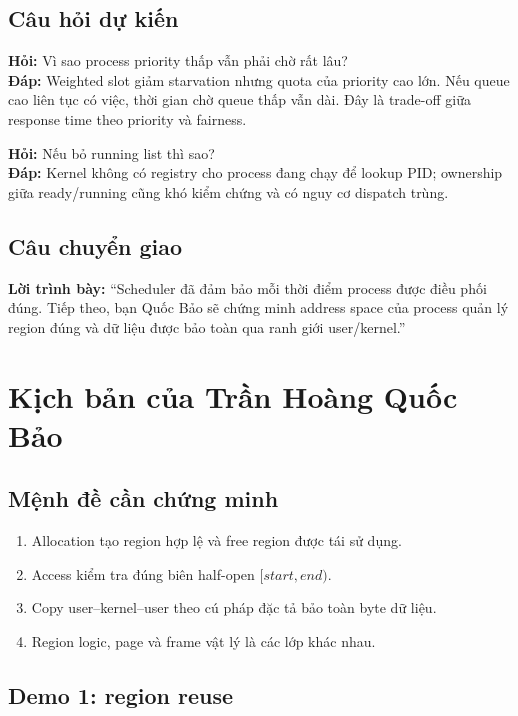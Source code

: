\documentclass[12pt,a4paper]{article}
\newcommand{\say}[1]{\textbf{\color{bkblue}Lời trình bày:} ``#1''}
\begin{document}
\subsection{Câu hỏi dự kiến}

\textbf{Hỏi:} Vì sao process priority thấp vẫn phải chờ rất lâu?\\
\textbf{Đáp:} Weighted slot giảm starvation nhưng quota của priority cao lớn.
Nếu queue cao liên tục có việc, thời gian chờ queue thấp vẫn dài. Đây là
trade-off giữa response time theo priority và fairness.

\textbf{Hỏi:} Nếu bỏ running list thì sao?\\
\textbf{Đáp:} Kernel không có registry cho process đang chạy để lookup PID;
ownership giữa ready/running cũng khó kiểm chứng và có nguy cơ dispatch trùng.

\subsection{Câu chuyển giao}

\say{Scheduler đã đảm bảo mỗi thời điểm process được điều phối đúng. Tiếp theo,
bạn Quốc Bảo sẽ chứng minh address space của process quản lý region đúng và
dữ liệu được bảo toàn qua ranh giới user/kernel.}

\section{Kịch bản của Trần Hoàng Quốc Bảo}

\subsection{Mệnh đề cần chứng minh}

\begin{enumerate}
  \item Allocation tạo region hợp lệ và free region được tái sử dụng.
  \item Access kiểm tra đúng biên half-open \([start,end)\).
  \item Copy user--kernel--user theo cú pháp đặc tả bảo toàn byte dữ liệu.
  \item Region logic, page và frame vật lý là các lớp khác nhau.
\end{enumerate}

\subsection{Demo 1: region reuse}
\end{document}
